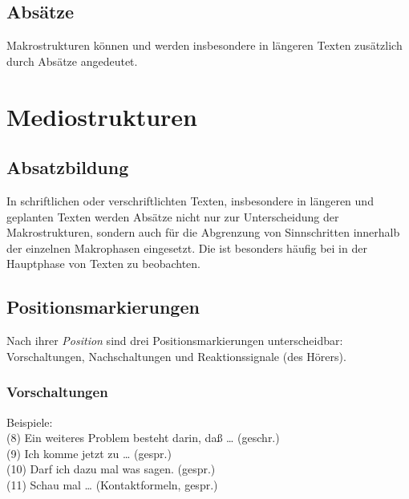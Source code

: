 \documentclass[
  letterpaper,
]{scrbook}
\begin{document}
\hypertarget{absuxe4tze}{%
\subsection{Absätze}\label{absuxe4tze}}

Makrostrukturen können und werden insbesondere in längeren Texten
zusätzlich durch Absätze angedeutet.\\

\hypertarget{mediostrukturen}{%
\section{\texorpdfstring{Mediostrukturen\\
}{Mediostrukturen }}\label{mediostrukturen}}

\hypertarget{absatzbildung}{%
\subsection{Absatzbildung}\label{absatzbildung}}

In schriftlichen oder verschriftlichten Texten, insbesondere in längeren
und geplanten Texten werden Absätze nicht nur zur Unterscheidung der
Makrostrukturen, sondern auch für die Abgrenzung von Sinnschritten
innerhalb der einzelnen Makrophasen eingesetzt. Die ist besonders häufig
bei in der Hauptphase von Texten zu beobachten.\\

\hypertarget{positionsmarkierungen}{%
\subsection{Positionsmarkierungen}\label{positionsmarkierungen}}

Nach ihrer \emph{Position} sind drei Positionsmarkierungen
unterscheidbar:\\
Vorschaltungen, Nachschaltungen und Reaktionssignale (des Hörers).\\

\hypertarget{vorschaltungen}{%
\subsubsection{Vorschaltungen}\label{vorschaltungen}}

Beispiele:\\
(8) Ein weiteres Problem besteht darin, daß \ldots{} (geschr.)\\
(9) Ich komme jetzt zu \ldots{} (gespr.)\\
(10) Darf ich dazu mal was sagen. (gespr.)\\
(11) Schau mal \ldots{} (Kontaktformeln, gespr.)\\
\end{document}
